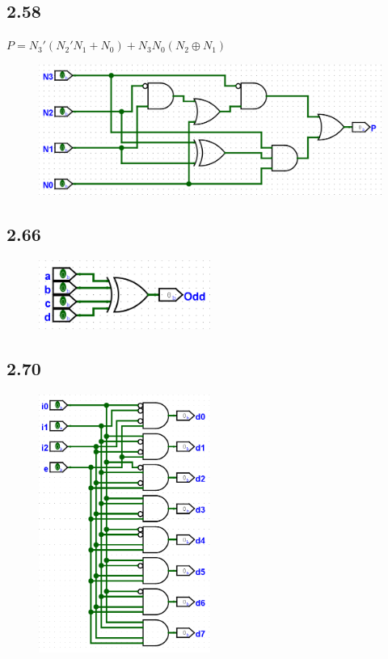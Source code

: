 \documentclass{article}
\begin{document}
\newpage
\subsection*{2.58}
$P = N_3'(N_2' N_1 + N_0) + N_3 N_0 (N_2 \oplus N_1)$
\begin{figure}[h]
    \centering
    \includegraphics[width=\textwidth]{./images/2_58.png}
\end{figure}

\subsection*{2.66}
\begin{figure}[h]
    \centering
    \includegraphics[width=0.5\textwidth]{./images/2_66.png}
\end{figure}

\newpage
\subsection*{2.70}
\begin{figure}[h]
    \centering
    \includegraphics[width=0.5\textwidth]{./images/2_70.png}
\end{figure}
\end{document}
